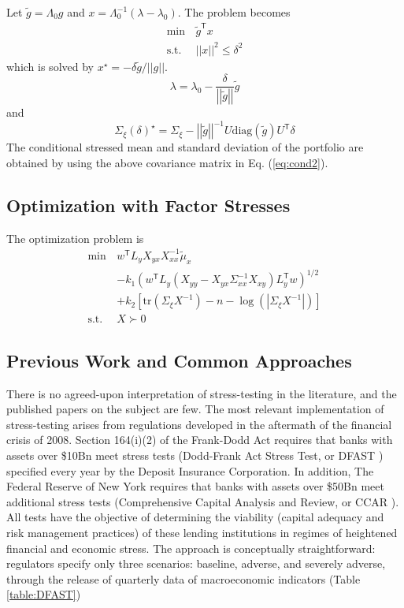 \documentclass[letter, 12pt]{article}
\newcommand{\transpose}{^\mathsf{T}}
\newcommand{\trace}[1]{{\text{tr}}\left( #1 \right)}
\newcommand{\suchthat}{\text{s.t.}}
\newcommand{\norm}[1]{\left|\left|#1 \right|\right|}
\newcommand{\diag}[1]{\text{diag} \left(#1 \right)}
\newcommand{\inv}{^{-1}}
\begin{document}
Let $\tilde g=\Lambda_0 g$ and $x=\Lambda_0\inv(\lambda-\lambda_0)$. The problem becomes
\begin{align*}
\min\, & \tilde g\transpose x\\
	\suchthat\, &  \norm{x}^2 \le \delta^2 
\end{align*}
which is solved by  $x^\star=-\delta\tilde g/\norm{g}$.
\[
\lambda=\lambda_0- \frac{\delta}{\norm{\tilde g} }\tilde g
\]
and
\[
\Sigma_\xi(\delta)^\star =\Sigma_\xi- \norm{\tilde g}\inv  U \diag{\tilde g} U\transpose \delta
\]
The conditional stressed mean and standard deviation of the portfolio are obtained by using the above covariance matrix in Eq. (\ref{eq:cond2}).
\subsection{Optimization with Factor Stresses}
The optimization problem is 
\begin{align*}
\min \, & w\transpose  L_y  X_{yx} X_{xx}\inv \tilde \mu_x  \\
    & - k_1 \left( w\transpose L_y (X_{yy} - X_{yx} \Sigma_{xx}\inv  X_{xy}) L_y\transpose w \right)^{1/2} \\
        &+ k_2 [\trace{\Sigma_\xi X\inv} -n -\log( |\Sigma_\xi X\inv|)]\\
        \suchthat& X \succ 0
\end{align*}
%
%
\subsection{Previous Work and Common Approaches}
%
There is no agreed-upon interpretation of stress-testing in the literature, and the published papers on the subject are few. The most relevant implementation of stress-testing arises from regulations developed in the aftermath of the financial crisis of 2008. Section 164(i)(2) of the Frank-Dodd Act requires that banks with assets over \$10Bn meet stress tests (Dodd-Frank Act Stress Test, or DFAST \cite{fed2013}) specified every year by the Deposit Insurance Corporation. In addition, The Federal Reserve of New York requires that banks with assets over \$50Bn meet additional stress tests (Comprehensive Capital Analysis and Review, or CCAR \cite{fed2017, fed2018}). All tests have the objective of determining the viability (capital adequacy and risk management practices) of these lending institutions in regimes of heightened financial and economic stress. The approach is conceptually straightforward: regulators specify only three scenarios: baseline, adverse, and severely adverse, through the release of quarterly data of macroeconomic indicators (Table \ref{table:DFAST})
\end{document}
